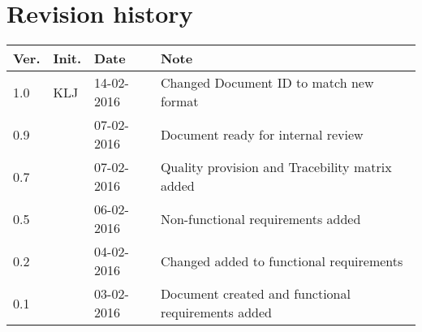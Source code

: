 \label{chp_revisionHistory}
\chapter{Revision history}

\begin{tabular}{b{1cm} b{1cm} b{2cm} b{8cm}}
    \textbf{Ver.} & \textbf{Init.} & \textbf{Date} & \textbf{Note} \\
    \hline
    1.0 & KLJ & 14-02-2016 & Changed Document ID to match new format \\
    0.9 &  & 07-02-2016 & Document ready for internal review \\
    0.7 &  & 07-02-2016 & Quality provision and Tracebility matrix added \\
    0.5 &  & 06-02-2016 & Non-functional requirements added \\
	0.2 &  & 04-02-2016 & Changed added to functional requirements \\
    0.1 &  & 03-02-2016 & Document created and functional requirements added  \\
\end{tabular}

